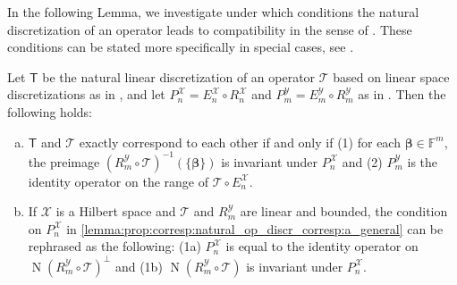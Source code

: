 \documentclass[a4paper]{paper}
\newcommand*{\SPC}[1]{{\ensuremath{\mathscr{#1}}}}
\newcommand*{\SPCX}{\SPC{X}}
\newcommand*{\SPCY}{\SPC{Y}}
\newcommand{\FIELD}{{\ensuremath{\mathbb{F}}}}
\newcommand*{\Fm}{{\ensuremath{\FIELD^m}}}
\newcommand*{\OP}[1]{{\ensuremath{\mathcal{#1}}}}
\newcommand*{\OPT}{\OP{T}}
\newcommand{\DISCOP}[1]{{\ensuremath{\mathsf{#1}}}}
\newcommand*{\DISCOPT}{\DISCOP{T}}
\newcommand*{\EXT}[2]{\ensuremath{E_{#1}^{#2}}}
\newcommand*{\REST}[2]{\ensuremath{R_{#1}^{#2}}}
\newcommand*{\PROJ}[2]{\ensuremath{P_{#1}^{#2}}}
\newcommand*{\RnX}{{\ensuremath{\REST{n}{\SPC{X}}}}}
\newcommand*{\RmY}{{\ensuremath{\REST{m}{\SPC{Y}}}}}
\newcommand*{\EnX}{{\ensuremath{\EXT{n}{\SPC{X}}}}}
\newcommand*{\EmY}{{\ensuremath{\EXT{m}{\SPC{Y}}}}}
\newcommand*{\PnX}{{\ensuremath{\PROJ{n}{\SPCX}}}}
\newcommand*{\PmY}{{\ensuremath{\PROJ{m}{\SPCY}}}}
\DeclareMathOperator{\NULL}{N}
\newcommand{\vbeta}{\boldsymbol{\beta}}
\begin{document}
In the following Lemma, we investigate under which conditions the natural discretization of an operator leads to 
compatibility in the sense of . These conditions can be stated more 
specifically in special cases, see .


\begin{lemma}
 \label{lemma:prop:corresp:natural_op_discr_corresp}
 Let $\DISCOPT$ be the natural linear discretization of an operator $\OPT$ based on linear space discretizations as 
 in , and let $\PnX = \EnX \circ \RnX$ and $\PmY = \EmY \circ \RmY$ as in 
 . Then the following holds:
 
 \begin{enumerate}[(a)]
  \item \label{lemma:prop:corresp:natural_op_discr_corresp:a_general}
  $\DISCOPT$ and $\OPT$ exactly correspond to each other if and only if (1) for each $\vbeta \in \Fm$, the 
  preimage $(\RmY \circ \OPT)^{-1}(\{\vbeta\})$ is invariant under $\PnX$ and (2) $\PmY$ is the identity operator on 
  the range of $\OPT \circ \EnX$.

  \item \label{lemma:prop:corresp:natural_op_discr_corresp:b_hilbert_linear}
  If $\SPCX$ is a Hilbert space and $\OPT$ and $\RmY$ are linear and bounded, the condition on $\PnX$ in 
  \eqref{lemma:prop:corresp:natural_op_discr_corresp:a_general} can be rephrased as the following: 
  (1a) $\PnX$ is equal to the identity operator on $\NULL(\RmY \circ \OPT)^\perp$ and (1b) 
  $\NULL(\RmY \circ \OPT)$ is invariant under $\PnX$.
  
 \end{enumerate}
\end{lemma}
\vspace{1em}
\end{document}
